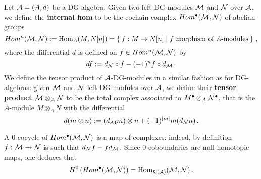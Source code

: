 	Let $\mathcal{A}=(A,d)$ be a DG-algebra.
	 Given two left DG-modules $\mathcal{M}$ and $\mathcal{N}$ over $\mathcal{A}$,
	we define the \textbf{internal hom} to be 
	the cochain complex $Hom^{\bullet}(\mathcal{M},\mathcal{N})$	of abelian groups
	\begin{equation*}
		Hom^{n}(\Mm,\Nn) := \Hom_{A}(M, N[n]) 
		= \Set{f:M \to N[n] | f \text{ morphism of %
		} A\text{-modules}}\,,
	\end{equation*}
	where the differential $d$ is defined on $f \in Hom^{n}(\mathcal{M},\mathcal{N})$ by
	\begin{equation*}
		df := d_{\mathcal{N}} \circ f - (-1)^{n} f \circ d_{\mathcal{M}}\,.
	\end{equation*}
	We define the tensor product of $\mathcal{A}$-DG-modules in a similar fashion
	as for DG-algebras: given $\mathcal{M}$ and $\mathcal{N}$ left DG-modules over $\mathcal{A}$, 
	we define their \textbf{tensor product} $\mathcal{M} \otimes_{\mathcal{A}} \mathcal{N}$
	to be the total complex associated to $M^{\bullet} \otimes_{A} \mathcal{N}^{\bullet}$,
	that is the $A$-module $M \otimes_{A} N$ with the differential
	\begin{equation*}
		d(m \otimes n) := (d_{\mathcal{M}}m) \otimes n + (-1)^{|m|}m (d_{\mathcal{N}}n)\,.
	\end{equation*}
	
	\begin{ex}
		A $0$-cocycle of $Hom^{\bullet}(\mathcal{M},\mathcal{N})$ is a map of complexes:
		indeed, by definition $f:\mathcal{M} \to \mathcal{N}$ is such that $d_{\mathcal{N}}f - fd_{\mathcal{M}}$.
		Since $0$-coboundaries are null homotopic maps, one deduces that
		\begin{equation*}
			H^{0}\left(Hom^{\bullet}(\mathcal{M},\mathcal{N}) \right)
			= \operatorname{Hom}_{\mathcal{K}(\mathcal{A})}(\mathcal{M},\mathcal{N})\,.
		\end{equation*}
	\end{ex}
	
